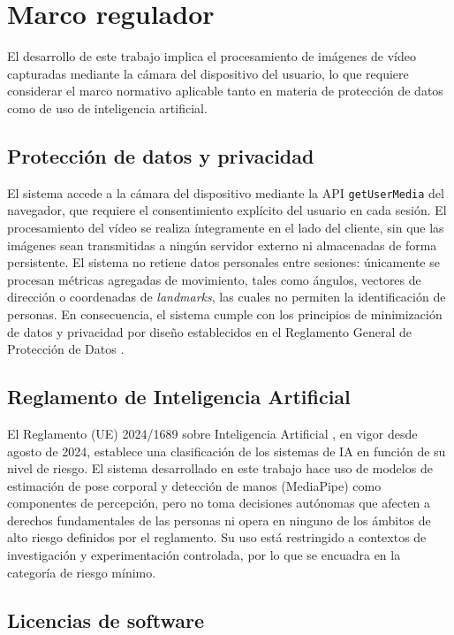 \documentclass[12pt]{report} %
\begin{document}
\section{Marco regulador}

El desarrollo de este trabajo implica el procesamiento de imágenes de vídeo capturadas mediante la cámara del dispositivo del usuario, lo que requiere considerar el marco normativo aplicable tanto en materia de protección de datos como de uso de inteligencia artificial.

\subsection{Protección de datos y privacidad}
\label{sec:privacidad}

El sistema accede a la cámara del dispositivo mediante la API \texttt{getUserMedia} del navegador, que requiere el consentimiento explícito del usuario en cada sesión. El procesamiento del vídeo se realiza íntegramente en el lado del cliente, sin que las imágenes sean transmitidas a ningún servidor externo ni almacenadas de forma persistente. El sistema no retiene datos personales entre sesiones: únicamente se procesan métricas agregadas de movimiento, tales como ángulos, vectores de dirección o coordenadas de \textit{landmarks}, las cuales no permiten la identificación de personas. En consecuencia, el sistema cumple con los principios de minimización de datos y privacidad por diseño establecidos en el Reglamento General de Protección de Datos \citep{rgpd2016}.

\subsection{Reglamento de Inteligencia Artificial}

El Reglamento (UE) 2024/1689 sobre Inteligencia Artificial \citep{aiact2024}, en vigor desde agosto de 2024, establece una clasificación de los sistemas de IA en función de su nivel de riesgo. El sistema desarrollado en este trabajo hace uso de modelos de estimación de pose corporal y detección de manos (MediaPipe) como componentes de percepción, pero no toma decisiones autónomas que afecten a derechos fundamentales de las personas ni opera en ninguno de los ámbitos de alto riesgo definidos por el reglamento. Su uso está restringido a contextos de investigación y experimentación controlada, por lo que se encuadra en la categoría de riesgo mínimo.

\subsection{Licencias de software}
\end{document}

